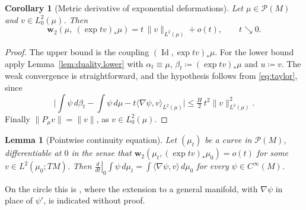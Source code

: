 \documentclass[11pt,reqno]{amsart}
\theoremstyle{plain}
\newtheorem{lem}[thm]{Lemma}
\newtheorem{cor}[thm]{Corollary}
\theoremstyle{definition}
\newcommand{\dw}{\mathbf{w}_2}
\newcommand{\Prob}{\mathcal{P}}
\DeclareMathOperator{\Id}{Id}
\begin{document}
\begin{cor}[Metric derivative of exponential deformations]
    \label{cor:metric.derivative}
    Let \( \mu\in\Prob(M) \) and \( v\in L^2_0(\mu) \).  
    Then
    \[
        \dw\left(\mu,\ (\exp tv)_\ast\mu\right)=t\,\lVert v\rVert_{L^2(\mu)}+o(t),\qquad t\searrow0 .
    \]
\end{cor}
\begin{proof}
    The upper bound is the coupling \( (\Id,\exp tv)_\ast\mu \).
    For the lower bound apply Lemma~\ref{lem:duality.lower} with \( \alpha_t\equiv\mu \), \( \beta_t\coloneqq(\exp tv)_\ast\mu \) and \( u\coloneqq v \).
    The weak convergence is straightforward, and the hypothesis follows from \eqref{eq:taylor}, since
    \[
        \Big\lvert\int\psi\,d\beta_t-\int\psi\,d\mu-t\langle\nabla\psi,v\rangle_{L^2(\mu)}\Big\rvert
        \le\tfrac{H}{2}\,t^2\lVert v\rVert^2_{L^2(\mu)} .
    \]
    Finally \( \lVert P_\mu v\rVert=\lVert v\rVert \), as \( v\in L^2_0(\mu) \).
\end{proof}

\begin{lem}[Pointwise continuity equation]
    \label{lem:pointwise.continuity}
    Let \( (\mu_t) \) be a curve in \( \Prob(M) \), differentiable at \( 0 \) in the sense that \(\dw(\mu_t,(\exp tv)_\ast\mu_0)=o(t)\) for some \(v\in L^2(\mu_0;TM)\). 
    Then \(\left.\frac{d}{dt}\right\rvert_{0}\int\psi\,d\mu_t=\int\langle\nabla\psi,v\rangle\,d\mu_0\) for every \(\psi\in C^\infty(M)\).
\end{lem}

On the circle this is \cite[Lemma 7.1]{kloeckner_optimal_2013_preprint}, where the extension to a general manifold, with \( \nabla\psi \) in place of \( \psi' \), is indicated without proof.
\end{document}
